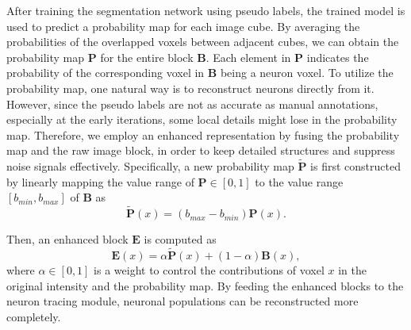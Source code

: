 After training the segmentation network using pseudo labels, the trained model is used to predict a probability map for each image cube. 
By averaging the probabilities of the overlapped voxels between adjacent cubes, we can obtain the probability map $\mathbf{P}$ for the entire block $\mathbf{B}$.
Each element in $\mathbf{P}$ indicates the probability of the corresponding voxel in $\mathbf{B}$ being a neuron voxel.
To utilize the probability map, one natural way is to reconstruct neurons directly from it.
However, since the pseudo labels are not as accurate as manual annotations, especially at the early iterations, some local details might lose in the probability map. Therefore, we employ an enhanced representation by fusing the probability map and the raw image block, in order to keep detailed structures and suppress noise signals effectively.
Specifically, a new probability map $\widetilde{\mathbf{P}} $ is first constructed by linearly mapping the value range of $ \mathbf{P}\in [0,1] $ to the value range $[{b}_{min}, {b}_{max}]$ of $\mathbf{B}$ as
\begin{equation}
\widetilde{\mathbf{P}}(x) = ({b}_{max}-{b}_{min})\mathbf{P}(x).
\end{equation}


Then, an enhanced block $\mathbf{E}$ is computed as
\begin{equation}
\mathbf{E}(x) = \alpha\widetilde{\mathbf{P}}(x) + (1-\alpha)\mathbf{B}(x),
\label{equ: enhance}
\end{equation}
where $\alpha\in [0,1]$ is a weight to control the contributions of voxel $ x $ in the original intensity and the probability map. By feeding the enhanced blocks to the neuron tracing module, neuronal populations can be reconstructed more completely.


